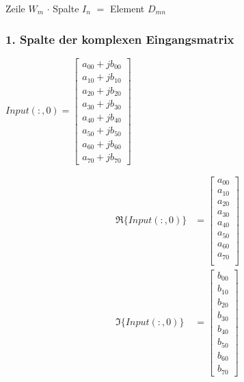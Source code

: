 \begin{frame}
\begin{center}
\begin{minipage}{0.2\textwidth}
 \endgroup
\end{minipage}
\end{center}

\vspace{1cm}
\begin{center}
Zeile $W_m$  $\cdot $ Spalte $I_n$  $ = $ Element $D_{mn}$
\end{center}



\end{frame}




\begin{frame}\frametitle{1. Spalte der komplexen Eingangsmatrix}
 
 \begin{minipage}{0.45\textwidth}
  $Input(:,0) = \begin{bmatrix}
           a_{00}+jb_{00}\\
           a_{10}+jb_{10}\\
           a_{20}+jb_{20}\\
           a_{30}+jb_{30}\\
           a_{40}+jb_{40}\\
           a_{50}+jb_{50}\\
           a_{60}+jb_{60}\\
           a_{70}+jb_{70}
  \end{bmatrix}$
 \end{minipage}
 \begin{minipage}{0.45\textwidth}
 \begin{align*}
 \Re\{Input(:,0)\} &= \begin{bmatrix}
           a_{00}\\
           a_{10}\\
           a_{20}\\
           a_{30}\\
           a_{40}\\
           a_{50}\\
           a_{60}\\
           a_{70}\\
  \end{bmatrix}\\
 \Im\{Input(:,0)\} &= \begin{bmatrix}
           b_{00}\\
           b_{10}\\
           b_{20}\\
           b_{30}\\
           b_{40}\\
           b_{50}\\
           b_{60}\\
           b_{70}
  \end{bmatrix}
\end{align*}
 \end{minipage}

 
\end{frame}


